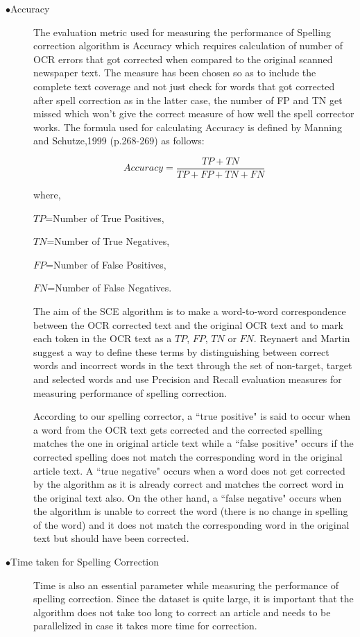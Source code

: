 \documentclass[letterpaper,11pt]{report}
\begin{document}
\begin{description}

 \item[$\bullet$Accuracy]
 The evaluation metric used for measuring the performance of Spelling correction algorithm is Accuracy which requires calculation of number of OCR errors that got corrected when compared to the original scanned newspaper text. The measure has been chosen so as to include the complete text coverage and not just check for words that got corrected after spell correction as in the latter case, the  number of FP and TN get missed which won't give the correct measure of how well the spell corrector works. The formula used for calculating Accuracy is defined by Manning and Schutze,1999 (p.268-269) as follows:

$$Accuracy=  \dfrac{TP+TN} {TP+ FP + TN + FN}$$


where, 

$TP$=Number of True Positives,

$TN$=Number of True Negatives,

 $FP$=Number of False Positives,

 $FN$=Number of False Negatives. 

The aim of the SCE algorithm is to make a word-to-word correspondence between the OCR corrected text and the original OCR text and to mark each token in the OCR text as a $TP$, $FP$, $TN$ or $FN$. Reynaert and Martin\cite{reynaert2008all} suggest a way to define these terms by distinguishing between correct words and incorrect words in the text through the set of non-target, target and selected words and use Precision and Recall evaluation measures for measuring performance of spelling correction. 

According to our spelling corrector, a ``true positive" is said to occur when a word from the OCR text gets corrected and the corrected spelling matches the one in original article text while a ``false positive" occurs if the corrected spelling does not match the corresponding word in the original article text. A ``true negative" occurs when a word does not get corrected by the algorithm as it is already correct and matches the correct word in the original text also. On the other hand, a ``false negative" occurs when the algorithm is unable to correct the word (there is no change in spelling of the word) and it does not match the corresponding word in the original text but should have been corrected.



\item[$\bullet$Time taken for Spelling Correction]
Time is also an essential parameter while measuring the performance of spelling correction. Since the dataset is quite large, it is important that the algorithm does not take too long to correct an article and needs to be parallelized in case it takes more time for correction.



\end{description}
\end{document}
